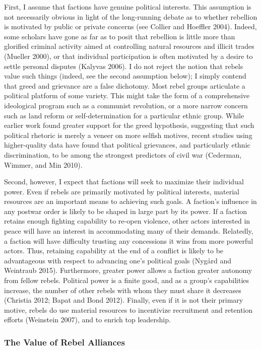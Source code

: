 \documentclass[12pt,]{article}
\begin{document}
First, I assume that factions have genuine political interests. This
assumption is not necessarily obvious in light of the long-running
debate as to whether rebellion is motivated by public or private
concerns (see Collier and Hoeffler 2004). Indeed, some scholars have
gone as far as to posit that rebellion is little more than glorified
criminal activity aimed at controlling natural resources and illicit
trades (Mueller 2000), or that individual participation is often
motivated by a desire to settle personal disputes (Kalyvas 2006). I do
not reject the notion that rebels value such things (indeed, see the
second assumption below); I simply contend that greed and grievance are
a false dichotomy. Most rebel groups articulate a political platform of
some variety. This might take the form of a comprehensive ideological
program such as a communist revolution, or a more narrow concern such as
land reform or self-determination for a particular ethnic group. While
earlier work found greater support for the greed hypothesis, suggesting
that such political rhetoric is merely a veneer on more selfish motives,
recent studies using higher-quality data have found that political
grievances, and particularly ethnic discrimination, to be among the
strongest predictors of civil war (Cederman, Wimmer, and Min 2010).

Second, however, I expect that factions will seek to maximize their
individual power. Even if rebels are primarily motivated by political
interests, material resources are an important means to achieving such
goals. A faction's influence in any postwar order is likely to be shaped
in large part by its power. If a faction retains enough fighting
capability to re-open violence, other actors interested in peace will
have an interest in accommodating many of their demands. Relatedly, a
faction will have difficulty trusting any concessions it wins from more
powerful actors. Thus, retaining capability at the end of a conflict is
likely to be advantageous with respect to advancing one's political
goals (Nygård and Weintraub 2015). Furthermore, greater power allows a
faction greater autonomy from fellow rebels. Political power is a finite
good, and as a group's capabilities increase, the number of other rebels
with whom they must share it decreases (Christia 2012; Bapat and Bond
2012). Finally, even if it is not their primary motive, rebels do use
material resources to incentivize recruitment and retention efforts
(Weinstein 2007), and to enrich top leadership.

\subsubsection{The Value of Rebel
Alliances}\label{the-value-of-rebel-alliances}
\end{document}
